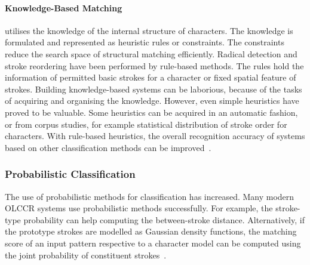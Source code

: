 \paragraph{Knowledge-Based Matching} utilises the knowledge of the internal 
structure of characters. The knowledge is formulated and represented as heuristic
rules or constraints. The constraints reduce the search space of structural 
matching efficiently. Radical detection and stroke reordering have been performed
by rule-based methods. The rules hold the information of permitted basic strokes
for a character or fixed spatial feature of strokes.
Building knowledge-based systems can be laborious, because of the tasks of 
acquiring and organising the knowledge. However, even simple heuristics have
proved to be valuable. Some heuristics can be acquired in an automatic fashion,
or from corpus studies, for example statistical distribution of stroke order for
characters. With rule-based heuristics, the overall recognition accuracy of
systems based on other classification methods can be 
improved~.

\subsubsection{Probabilistic Classification}
\label{sec:olccr:probabilisticclassification}

The use of probabilistic methods for classification has increased. Many modern 
OLCCR systems use probabilistic methods successfully. For example, the stroke-type
probability can help computing the between-stroke distance. Alternatively,
if the prototype strokes are modelled as Gaussian density functions, the 
matching score of an input pattern respective to a character model can be 
computed using the joint probability of constituent 
strokes~.

